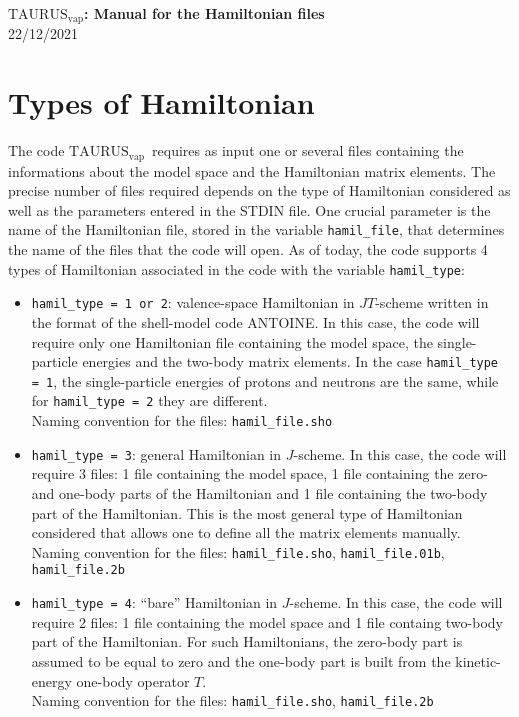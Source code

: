 \documentclass[a4paper,11pt]{article}
\newcommand{\TAURUSvap}{$\text{TAURUS}_{\text{vap}}$}
\newcommand{\TAURUSvapt}{$\text{TAURUS}_{\text{vap}}$~}
\renewcommand{\tt}[1]{\texttt{#1}}
\begin{document}
%
% 
\begin{center}
 {\LARGE \textbf{\TAURUSvap: Manual for the Hamiltonian files}} \\
 {\large 22/12/2021}
\end{center}

%
% 
\section{Types of Hamiltonian}

The code \TAURUSvapt requires as input one or several files containing the informations about the model space and the Hamiltonian matrix elements.
The precise number of files required depends on the type of Hamiltonian considered as well as the parameters entered in the STDIN file.
One crucial parameter is the name of the Hamiltonian file, stored in the variable \tt{hamil\_file}, that determines the name of the files that the code will open.
As of today, the code supports 4 types of Hamiltonian associated in the code with the variable \tt{hamil\_type}:

\begin{itemize}
  \item \tt{hamil\_type = 1 or 2}: valence-space Hamiltonian in $JT$-scheme written in the format of the shell-model code ANTOINE.
  In this case, the code will require only one Hamiltonian file containing the model space, the single-particle energies and the 
  two-body matrix elements. 
  In the case \tt{hamil\_type = 1}, the single-particle energies of protons and neutrons are the same, while for 
  \tt{hamil\_type = 2} they are different. \\
  Naming convention for the files: \tt{hamil\_file.sho}
  
  \item \tt{hamil\_type = 3}: general Hamiltonian in $J$-scheme. In this case, the code will require
  3 files: 1 file containing the model space, 1 file containing the zero- and one-body parts of the Hamiltonian and 1 file containing the
  two-body part of the Hamiltonian. This is the most general type of Hamiltonian considered that allows one to define all the matrix elements
  manually. \\
  Naming convention for the files: \tt{hamil\_file.sho}, \tt{hamil\_file.01b}, \tt{hamil\_file.2b} 

  \item \tt{hamil\_type = 4}: ``bare'' Hamiltonian in $J$-scheme. In this case, the code will require
  2 files: 1 file containing the model space and 1 file containg two-body part of the Hamiltonian. For such Hamiltonians, the zero-body part
  is assumed to be equal to zero and the one-body part is built from the kinetic-energy one-body operator $T$. \\
  Naming convention for the files: \tt{hamil\_file.sho}, \tt{hamil\_file.2b} 
  
\end{itemize}
\end{document}

